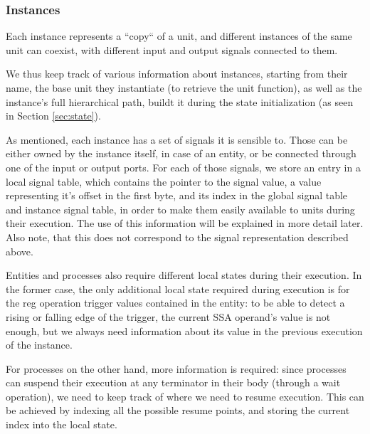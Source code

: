 
\subsubsection{Instances}
Each instance represents a “copy“ of a unit, and different instances of the same unit can coexist, with different input and output signals connected to them.

We thus keep track of various information about instances, starting from their name, the base unit they instantiate (to retrieve the unit function), as well as the instance's full hierarchical path, buildt it during the state initialization (as seen in Section \ref{sec:state}).


As mentioned, each instance has a set of signals it is sensible to. Those can be either owned by the instance itself, in case of an entity, or be connected through one of the input or output ports. For each of those signals, we store an entry in a local signal table, which contains the pointer to the signal value, a value representing it's offset in the first byte, and its index in the global signal table and instance signal table, in order to make them easily available to units during their execution. The use of this information will be explained in more detail later. Also note, that this does not correspond to the signal representation described above.

Entities and processes also require different local states during their execution. In the former case, the only additional local state required during execution is for the reg operation trigger values contained in the entity: to be able to detect a rising or falling edge of the trigger, the current SSA operand's value is not enough, but we always need information about its value in the previous execution of the instance.

For processes on the other hand, more information is required: since processes can suspend their execution at any terminator in their body (through a wait operation), we need to keep track of where we need to resume execution. This can be achieved by indexing all the possible resume points, and storing the current index into the local state.

